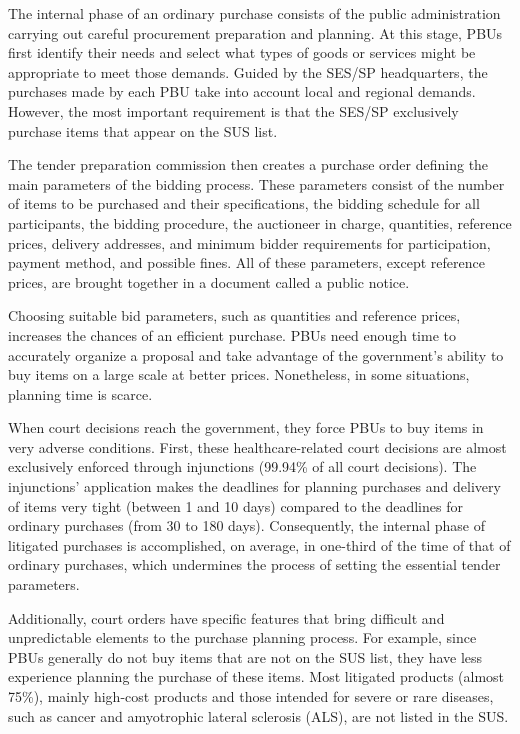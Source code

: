The internal phase of an ordinary purchase consists of the public administration carrying out careful procurement preparation and planning. At this stage, PBUs first identify their needs and select what types of goods or services might be appropriate to meet those demands. Guided by the SES/SP headquarters, the purchases made by each PBU take into account local and regional demands. However, the most important requirement is that the SES/SP exclusively purchase items that appear on the SUS list.

The tender preparation commission then creates a purchase order defining the main parameters of the bidding process. These parameters consist of the number of items to be purchased and their specifications, the bidding schedule for all participants, the bidding procedure, the auctioneer in charge, quantities, reference prices, delivery addresses, and minimum bidder requirements for participation, payment method, and possible fines. All of these parameters, except reference prices, are brought together in a document called a public notice.

Choosing suitable bid parameters, such as quantities and reference prices, increases the chances of an efficient purchase. PBUs need enough time to accurately organize a proposal and take advantage of the government’s ability to buy items on a large scale at better prices. Nonetheless, in some situations, planning time is scarce.

When court decisions reach the government, they force PBUs to buy items in very adverse conditions. First, these healthcare-related court decisions are almost exclusively enforced through injunctions (99.94\% of all court decisions). The injunctions’ application makes the deadlines for planning purchases and delivery of items very tight (between 1 and 10 days) compared to the deadlines for ordinary purchases (from 30 to 180 days). Consequently, the internal phase of litigated purchases is accomplished, on average, in one-third of the time of that of ordinary purchases, which undermines the process of setting the essential tender parameters.

Additionally, court orders have specific features that bring difficult and unpredictable elements to the purchase planning process. For example, since PBUs generally do not buy items that are not on the SUS list, they have less experience planning the purchase of these items. Most litigated products (almost 75\%), mainly high-cost products and those intended for severe or rare diseases, such as cancer and amyotrophic lateral sclerosis (ALS), are not listed in the SUS.

